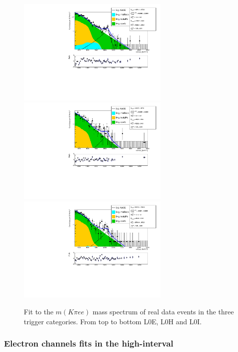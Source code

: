%
\begin{figure}[h!]
\centering
\includegraphics[width=0.65\textwidth]{RKst/figs/fit_EEs_0_EE-q2central-gmc/KstEE_L0E_log_fitAndRes.pdf}
\includegraphics[width=0.65\textwidth]{RKst/figs/fit_EEs_0_EE-q2central-gmc/KstEE_L0H_log_fitAndRes.pdf}
\includegraphics[width=0.65\textwidth]{RKst/figs/fit_EEs_0_EE-q2central-gmc/KstEE_L0I_log_fitAndRes.pdf}
\caption{Fit to the $m(K\pi ee)$ mass spectrum of \BdKstee real data events in the three trigger categories.
From top to bottom L0E, L0H and L0I.
}
\label{fig:FitEE_Data_inTrigCat}
\end{figure}


\subsubsection{Electron channels fits in the high-\qsq interval}

